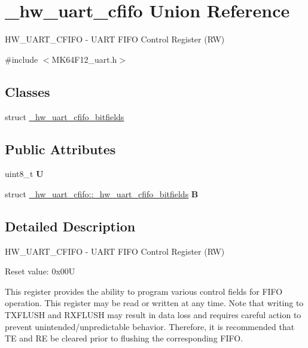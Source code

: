 \hypertarget{union__hw__uart__cfifo}{}\section{\+\_\+hw\+\_\+uart\+\_\+cfifo Union Reference}
\label{union__hw__uart__cfifo}


H\+W\+\_\+\+U\+A\+R\+T\+\_\+\+C\+F\+I\+FO -\/ U\+A\+RT F\+I\+FO Control Register (RW)  




{\ttfamily \#include $<$M\+K64\+F12\+\_\+uart.\+h$>$}

\subsection*{Classes}
\begin{DoxyCompactItemize}
\item 
struct \hyperlink{struct__hw__uart__cfifo_1_1__hw__uart__cfifo__bitfields}{\+\_\+hw\+\_\+uart\+\_\+cfifo\+\_\+bitfields}
\end{DoxyCompactItemize}
\subsection*{Public Attributes}
\begin{DoxyCompactItemize}
\item 
uint8\+\_\+t {\bfseries U}\hypertarget{union__hw__uart__cfifo_a9b421b4191fec5bbfc1c81aac0467a34}{}\label{union__hw__uart__cfifo_a9b421b4191fec5bbfc1c81aac0467a34}

\item 
struct \hyperlink{struct__hw__uart__cfifo_1_1__hw__uart__cfifo__bitfields}{\+\_\+hw\+\_\+uart\+\_\+cfifo\+::\+\_\+hw\+\_\+uart\+\_\+cfifo\+\_\+bitfields} {\bfseries B}\hypertarget{union__hw__uart__cfifo_affb440d40e5e652c994bd9b722999fce}{}\label{union__hw__uart__cfifo_affb440d40e5e652c994bd9b722999fce}

\end{DoxyCompactItemize}


\subsection{Detailed Description}
H\+W\+\_\+\+U\+A\+R\+T\+\_\+\+C\+F\+I\+FO -\/ U\+A\+RT F\+I\+FO Control Register (RW) 

Reset value\+: 0x00U

This register provides the ability to program various control fields for F\+I\+FO operation. This register may be read or written at any time. Note that writing to T\+X\+F\+L\+U\+SH and R\+X\+F\+L\+U\+SH may result in data loss and requires careful action to prevent unintended/unpredictable behavior. Therefore, it is recommended that TE and RE be cleared prior to flushing the corresponding F\+I\+FO. 

